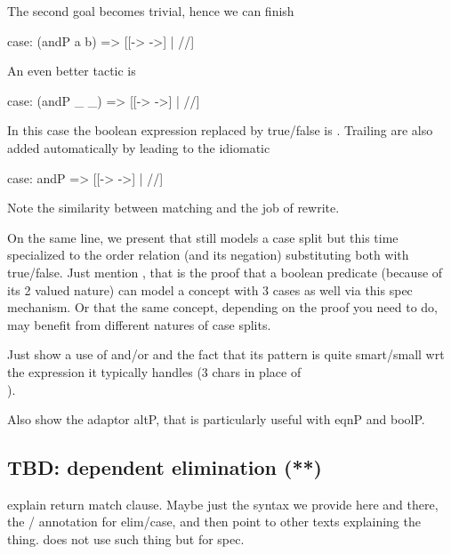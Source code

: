 The second goal becomes trivial, hence we can finish

\begin{coq}{}{}
case: (andP a b) => [[-> ->] | //]
\end{coq}

An even better tactic is

\begin{coq}{}{}
case: (andP _ _) => [[-> ->] | //]
\end{coq}

In this case the boolean expression replaced by true/false is \C{(_ && _)}.
Trailing \C{_} are also added automatically by  leading to the
idiomatic

\begin{coq}{}{}
case: andP => [[-> ->] | //]
\end{coq}

Note the similarity between matching \C{(_ && _)} and the job of rewrite.

On the same line, we present  that still models a case split but
this time specialized to the order relation (and its negation) substituting
both with true/false.  Just mention , that is the proof that
a boolean predicate (because of its 2 valued nature) can model a concept
with 3 cases as well via this spec mechanism.  Or that the same concept,
depending on the proof you need to do, may benefit from different natures
of case splits.


Just show a use of  and/or  and the fact that its pattern is
quite smart/small wrt the expression it typically handles (3 chars in place of\\
).

Also show the adaptor altP, that is particularly useful with eqnP and boolP.

\subsection{TBD: dependent elimination (**)}

explain return match clause.  Maybe just the syntax we provide here and
there, the / annotation for elim/case, and then point to other texts explaining
the thing.  \mcbMC{} does not use such thing but for spec.

